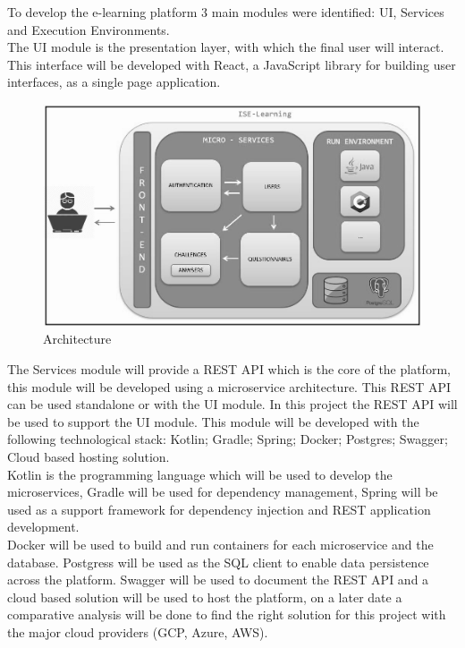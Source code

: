 To develop the e-learning platform 3 main modules were identified: UI, Services and Execution Environments.
\\
The UI module is the presentation layer, with which the final user will interact. This interface will be developed with React, a JavaScript library for building user interfaces, as a single page application.
\\
	\begin{figure}
  		\includegraphics[scale=0.6]{./imgs/arquitectura.JPG}
  		\caption{Architecture}
  		\label{fig:architecture}
	\end{figure} 
The Services module will provide a REST API which is the core of the platform, this module will be developed using a microservice architecture. This REST API can be used standalone or with the UI module. In this project the REST API will be used to support the UI module. This module will be developed with the following technological stack: Kotlin; Gradle; Spring; Docker; Postgres; Swagger; Cloud based hosting solution.
\\
Kotlin is the programming language which will be used to develop the microservices, Gradle will be used for dependency management, Spring will be used as a support framework for dependency injection and REST application development.
\\
Docker will be used to build and run containers for each microservice and the database. Postgress will be used as the SQL client to enable data persistence across the platform. Swagger will be used to document the REST API and a cloud based solution will be used to host the platform, on a later date a comparative analysis will be done to find the right solution for this project with the major cloud providers (GCP, Azure, AWS).
\\

